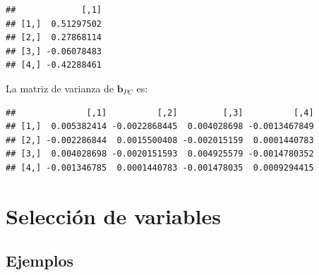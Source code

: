 \documentclass[
]{article}
\newenvironment{Shaded}{\begin{snugshade}}{\end{snugshade}}
\newcommand{\DecValTok}[1]{\textcolor[rgb]{0.00,0.00,0.81}{#1}}
\newcommand{\FunctionTok}[1]{\textcolor[rgb]{0.00,0.00,0.00}{#1}}
\newcommand{\NormalTok}[1]{#1}
\newcommand{\OtherTok}[1]{\textcolor[rgb]{0.56,0.35,0.01}{#1}}
\newcommand{\SpecialCharTok}[1]{\textcolor[rgb]{0.00,0.00,0.00}{#1}}
\begin{document}
\begin{Shaded}
\end{Shaded}

\begin{verbatim}
##             [,1]
## [1,]  0.51297502
## [2,]  0.27868114
## [3,] -0.06078483
## [4,] -0.42288461
\end{verbatim}

La matriz de varianza de \(\boldsymbol b_{PC}\) es:

\begin{Shaded}
\end{Shaded}

\begin{verbatim}
##              [,1]          [,2]         [,3]          [,4]
## [1,]  0.005382414 -0.0022868445  0.004028698 -0.0013467849
## [2,] -0.002286844  0.0015500408 -0.002015159  0.0001440783
## [3,]  0.004028698 -0.0020151593  0.004925579 -0.0014780352
## [4,] -0.001346785  0.0001440783 -0.001478035  0.0009294415
\end{verbatim}

\hypertarget{selecciuxf3n-de-variables}{%
\section{Selección de variables}\label{selecciuxf3n-de-variables}}

\hypertarget{ejemplos-3}{%
\subsection{Ejemplos}\label{ejemplos-3}}
\end{document}
